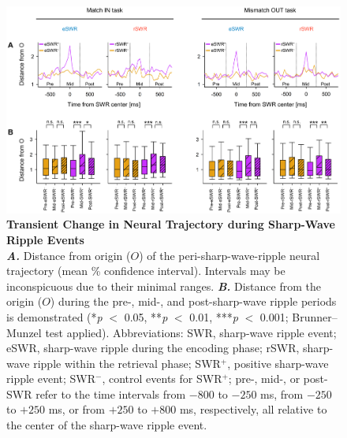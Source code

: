 \documentclass[final,3p,times,twocolumn]{elsarticle}
\begin{document}
        \begin{figure}[ht]
        	\centering
            \includegraphics[width=1\textwidth]{./src/figures/.png/Figure_ID_05.png}
        	\caption{\textbf{Transient Change in Neural Trajectory during Sharp-Wave Ripple Events}
\smallskip
\\
\textbf{\textit{A.}} Distance from origin ($O$) of the peri-sharp-wave-ripple neural trajectory (mean \% confidence interval). Intervals may be inconspicuous due to their minimal ranges. \textbf{\textit{B.}} Distance from the origin ($O$) during the pre-, mid-, and post-sharp-wave ripple periods is demonstrated (*\textit{p} $<$ 0.05, **\textit{p} $<$ 0.01, ***\textit{p} $<$ 0.001; Brunner--Munzel test applied). Abbreviations: SWR, sharp-wave ripple event; eSWR, sharp-wave ripple during the encoding phase; rSWR, sharp-wave ripple within the retrieval phase; SWR$^+$, positive sharp-wave ripple event; SWR$^-$, control events for SWR$^+$; pre-, mid-, or post-SWR refer to the time intervals from $-800$ to $-250$ ms, from $-250$ to $+250$ ms, or from $+250$ to $+800$ ms, respectively, all relative to the center of the sharp-wave ripple event.}
        	\label{fig:05}
        \end{figure}
        \clearpage
\end{document}

